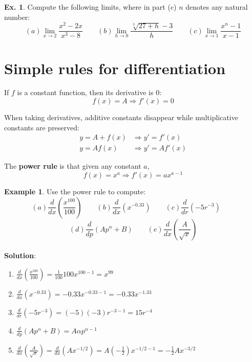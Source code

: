 \documentclass[10pt,a4paper]{book}
\theoremstyle{definition}\newtheorem{definition}{Definition}
\theoremstyle{definition}\newtheorem{fact}{Fact}
\theoremstyle{definition}\newtheorem{ex}{Ex.}
\theoremstyle{definition}\newtheorem{project}{Project}
\theoremstyle{definition}\newtheorem{problem}{Problem}
\theoremstyle{definition}\newtheorem{example}{Example}
\numberwithin{theorem}{chapter}
\numberwithin{corollary}{chapter}
\numberwithin{assumption}{chapter}
\numberwithin{definition}{chapter}
\numberwithin{prop}{chapter}
\numberwithin{notation}{chapter}
\numberwithin{problem}{chapter}
\numberwithin{example}{chapter}
\numberwithin{fact}{chapter}
\numberwithin{ex}{chapter}
\begin{document}
	\begin{ex}
		Compute the following limits, where in part (c) $n$ denotes any natural number:
		\begin{equation*}
			(a) \lim_{x \rightarrow 2}\frac{x^2-2x}{x^3-8} \qquad
			(b) \lim_{h \rightarrow 0} \frac{\sqrt[3]{27+h}-3}{h} \qquad
			(c) \lim_{x \rightarrow 1} \frac{x^n-1}{x-1}
		\end{equation*}
	\end{ex}
	
	\section{Simple rules for differentiation}
	
	If $f$ is a constant function, then its derivative is 0:
	$$f(x) = A \Rightarrow f'(x) = 0$$
	
	When taking derivatives, additive constants disappear while multiplicative constants are preserved:
	\begin{align*}
		y = A + f(x) & \Rightarrow y' = f'(x)  \\
		y = Af(x)    & \Rightarrow y' = Af'(x) 
	\end{align*}
	
	The \textbf{power rule} is that given any constant $a$,
	$$f(x) = x^a \Rightarrow f'(x) = ax^{a-1}$$
	
	\begin{example}
		Use the power rule to compute:
		\begin{equation*}
			(a) \frac{d}{dx} (\frac{x^{100}}{100}) \qquad
			(b) \frac{d}{dx} (x^{-0.33}) \qquad
			(c) \frac{d}{dr} (-5r^{-3}) \qquad
		\end{equation*}
		\begin{equation*}
			(d) \frac{d}{dp} (Ap^{\alpha}+B) \qquad
			(e) \frac{d}{dx} (\frac{A}{\sqrt{x}})
		\end{equation*}
		\\
		\textbf{Solution}:
		\begin{enumerate}[label=(\alph*)]
			\item $\frac{d}{dx} (\frac{x^{100}}{100}) = \frac{1}{100} 100x^{100-1} = x^{99}$
			\item $\frac{d}{dx} (x^{-0.33}) = -0.33x^{-0.33-1} = -0.33x^{-1.33}$
			\item $\frac{d}{dr} (-5r^{-3}) = (-5)(-3)r^{-3-1} = 15r^{-4}$
			\item $\frac{d}{dp} (Ap^{\alpha}+B) = A\alpha p^{\alpha-1}$
			\item $\frac{d}{dx} (\frac{A}{\sqrt{x}}) = \frac{d}{dx} (Ax^{-1/2}) = A(-\frac{1}{2})x^{-1/2-1} = -\frac{1}{2}Ax^{-3/2}$
		\end{enumerate}
	\end{example}
	
\end{document}
